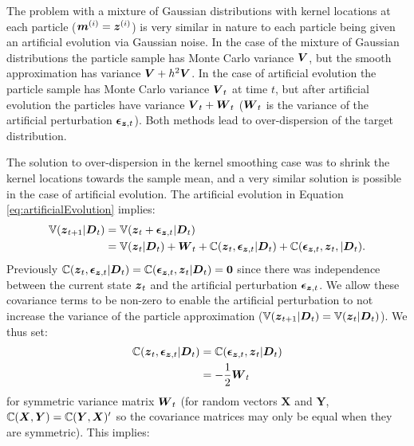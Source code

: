 The problem with a mixture of Gaussian distributions with kernel locations at each particle (\(\boldsymbol{m}^{(i)} =
\boldsymbol{z}^{(i)}\)) is very similar in nature to each particle being given an artificial evolution via Gaussian noise. In
the case of the mixture of Gaussian distributions the particle sample has Monte Carlo variance \(\boldsymbol{V}\), but the
smooth approximation has variance \(\boldsymbol{V} + h^2 \boldsymbol{V}\). In the case of artificial evolution the particle sample has
Monte Carlo variance \(\boldsymbol{V}_t\) at time \(t\), but after artificial evolution the particles have variance \(\boldsymbol{V}_t +
\boldsymbol{W}_t\) (\(\boldsymbol{W}_t\) is the variance of the artificial perturbation \(\boldsymbol{\epsilon}_{\boldsymbol{z}, t}\)). Both methods
lead to over-dispersion of the target distribution.

The solution to over-dispersion in the kernel smoothing case was to shrink the kernel locations towards the sample mean,
and a very similar solution is possible in the case of artificial evolution. The artificial evolution in Equation
\eqref{eq:artificialEvolution} implies:
\begin{align}
\mathbb{V}(\boldsymbol{z}_{t+1} | \boldsymbol{D}_t) &= \mathbb{V}(\boldsymbol{z}_t + \boldsymbol{\epsilon}_{\boldsymbol{z}, t} | \boldsymbol{D}_t) \notag \\
&= \mathbb{V}(\boldsymbol{z}_t | \boldsymbol{D}_t) + \boldsymbol{W}_t + \mathbb{C}(\boldsymbol{z}_t, \boldsymbol{\epsilon}_{\boldsymbol{z}, t} | \boldsymbol{D}_t) +
\mathbb{C}(\boldsymbol{\epsilon}_{\boldsymbol{z}, t}, \boldsymbol{z}_t, | \boldsymbol{D}_t).
\end{align}
Previously \(\mathbb{C}(\boldsymbol{z}_t, \boldsymbol{\epsilon}_{\boldsymbol{z}, t} | \boldsymbol{D}_t) = \mathbb{C}(\boldsymbol{\epsilon}_{\boldsymbol{z}, t}, \boldsymbol{z}_t
| \boldsymbol{D}_t) = \boldsymbol{0}\) since there was independence between the current state \(\boldsymbol{z}_t\) and the artificial
perturbation \(\boldsymbol{\epsilon}_{\boldsymbol{z}, t}\). We allow these covariance terms to be non-zero to enable the
artificial perturbation to not increase the variance of the particle approximation (\(\mathbb{V}(\boldsymbol{z}_{t+1} | \boldsymbol{D}_t) =
\mathbb{V}(\boldsymbol{z}_t | \boldsymbol{D}_t)\)). We thus set:
\begin{align}
\mathbb{C}(\boldsymbol{z}_t, \boldsymbol{\epsilon}_{\boldsymbol{z}, t} | \boldsymbol{D}_t) 
&= \mathbb{C}(\boldsymbol{\epsilon}_{\boldsymbol{z}, t}, \boldsymbol{z}_t | \boldsymbol{D}_t) \notag \\
&=-\frac{1}{2} \boldsymbol{W}_t
\end{align}
for symmetric variance matrix \(\boldsymbol{W}_t\) (for random vectors \(\boldsymbol{X}\) and \(\boldsymbol{Y}\),
\(\mathbb{C}(\boldsymbol{X}, \boldsymbol{Y}) = \mathbb{C}(\boldsymbol{Y}, \boldsymbol{X})'\) so the covariance matrices may only be
equal when they are symmetric). This implies:
